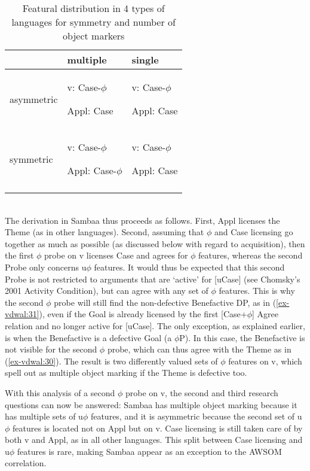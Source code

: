 \documentclass[output=paper
,modfonts
,nonflat]{langsci/langscibook}
\begin{document}
\begin{table}
\caption{Featural distribution in 4 types of languages for symmetry and number of object markers} 
\label{tab-vdwal:4}
	\begin{tabularx}{\textwidth}{XXX} 
	\lsptoprule	
		& multiple & single\\
	\midrule
		asymmetric &  v:       Case-$\phi$ \fbox{+ $\phi$}
		
		Appl: Case & { v:       Case-$\phi$} 
		
		Appl: Case\\ 
	\midrule
		symmetric & { v:       Case-$\phi$} 
		
		Appl: Case-$\phi$ & { v: Case-$\phi$} 
		
		Appl: Case\\
	\lspbottomrule		
	\end{tabularx}
\end{table}  \\ \noindent
The derivation in Sambaa thus proceeds as follows. First, Appl licenses the Theme (as in other languages). Second, assuming that $\phi$ and Case licensing go together as much as possible (as discussed below with regard to acquisition), then the first $\phi$ probe on v licenses Case and agrees for $\phi$ features, whereas the second Probe only concerns u$\phi$ features. It would thus be expected that this second Probe is not restricted to arguments that are ‘active’ for [uCase] (see Chomsky’s 2001 Activity Condition), but can agree with any set of $\phi$ features. This is why the second $\phi$ probe will still find the non-defective Benefactive DP, as in (\ref{ex-vdwal:31}), even if the Goal is already licensed by the first [Case+$\phi$] Agree relation and no longer active for [uCase]. The only exception, as explained earlier, is when the Benefactive is a defective Goal (a $\phi$P). In this case, the Benefactive is not visible for the second $\phi$ probe, which can thus agree with the Theme as in (\ref{ex-vdwal:30}). The result is two differently valued sets of $\phi$ features on v, which spell out as multiple object marking if the Theme is defective too.

With this analysis of a second $\phi$ probe on v, the second and third research questions can now be answered: Sambaa has multiple object marking because it has multiple sets of u$\phi$ features, and it is asymmetric because the second set of u$\phi$ features is located not on Appl but on v. Case licensing is still taken care of by both v and Appl, as in all other languages. This split between Case licensing and u$\phi$ features is rare, making Sambaa appear as an exception to the AWSOM correlation.
\end{document}
